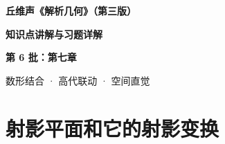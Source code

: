 \documentclass[11pt,a4paper,oneside,openany,fontset=none]{ctexbook}
\begin{document}
\frontmatter
\begin{titlepage}
\centering
\vspace*{0.25\textheight}
{\sffamily\bfseries\huge 丘维声《解析几何》（第三版）\par}
\vspace{1.6em}
{\sffamily\bfseries\Large 知识点讲解与习题详解\par}
\vspace{1.2em}
{\sffamily\bfseries\large 第 6 批：第七章\par}
\vfill
{\large 数形结合 · 高代联动 · 空间直觉\par}
\vspace*{2cm}
\end{titlepage}
\pagestyle{plain}
\tableofcontents
\mainmatter
\pagestyle{fancy}
\setcounter{chapter}{6}
\chapter{射影平面和它的射影变换}







\end{document}
